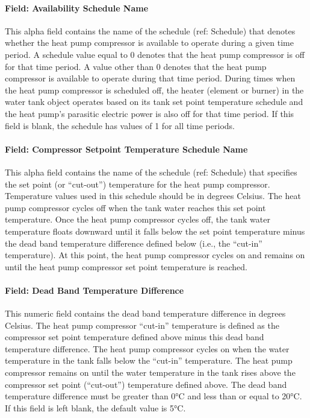 \paragraph{Field: Availability Schedule Name}\label{field-availability-schedule-name-019}

This alpha field contains the name of the schedule (ref: Schedule) that denotes whether the heat pump compressor is available to operate during a given time period. A schedule value equal to 0 denotes that the heat pump compressor is off for that time period. A value other than 0 denotes that the heat pump compressor is available to operate during that time period. During times when the heat pump compressor is scheduled off, the heater (element or burner) in the water tank object operates based on its tank set point temperature schedule and the heat pump's parasitic electric power is also off for that time period. If this field is blank, the schedule has values of 1 for all time periods.

\paragraph{Field: Compressor Setpoint Temperature Schedule Name}\label{field-compressor-setpoint-temperature-schedule-name}

This alpha field contains the name of the schedule (ref: Schedule) that specifies the set point (or ``cut-out'') temperature for the heat pump compressor. Temperature values used in this schedule should be in degrees Celsius. The heat pump compressor cycles off when the tank water reaches this set point temperature. Once the heat pump compressor cycles off, the tank water temperature floats downward until it falls below the set point temperature minus the dead band temperature difference defined below (i.e., the ``cut-in'' temperature). At this point, the heat pump compressor cycles on and remains on until the heat pump compressor set point temperature is reached.

\paragraph{Field: Dead Band Temperature Difference}\label{field-dead-band-temperature-difference-000}

This numeric field contains the dead band temperature difference in degrees Celsius. The heat pump compressor ``cut-in'' temperature is defined as the compressor set point temperature defined above minus this dead band temperature difference. The heat pump compressor cycles on when the water temperature in the tank falls below the ``cut-in'' temperature. The heat pump compressor remains on until the water temperature in the tank rises above the compressor set point (``cut-out'') temperature defined above. The dead band temperature difference must be greater than 0°C and less than or equal to 20°C. If this field is left blank, the default value is 5°C.

